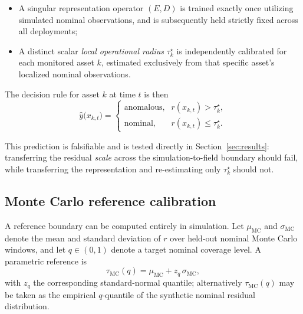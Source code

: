 \documentclass[a4paper]{cas-sc}
\newcommand{\residual}{\ensuremath{r}}
\newcommand{\taumc}{\ensuremath{\tau_{\mathrm{MC}}}}
\begin{document}
\begin{itemize}[leftmargin=1.5em]
\item A singular representation operator \((E,D)\) is trained exactly once utilizing simulated nominal observations, and is subsequently held strictly fixed across all deployments;
\item A distinct scalar \emph{local operational radius} \(\tau_k^\star\) is independently calibrated for each monitored asset \(k\), estimated exclusively from that specific asset's localized nominal observations.
\end{itemize}

The decision rule for asset \(k\) at time \(t\) is then
\begin{equation}
\hat y\bigl(x_{k,t}\bigr) =
\begin{cases}
\text{anomalous}, & \residual(x_{k,t}) > \tau_k^\star,\\[2pt]
\text{nominal},   & \residual(x_{k,t}) \le \tau_k^\star .
\end{cases}
\label{eq:decision_rule}
\end{equation}

This prediction is falsifiable and is tested directly in
Section~\ref{sec:results}: transferring the residual \emph{scale} across
the simulation-to-field boundary should fail, while transferring the
representation and re-estimating only \(\tau_k^\star\) should not.

\subsection{Monte Carlo reference calibration}
\label{subsec:mc_calibration}

A reference boundary can be computed entirely in simulation. Let
\(\mu_{\mathrm{MC}}\) and \(\sigma_{\mathrm{MC}}\) denote the mean and
standard deviation of \(\residual\) over held-out nominal Monte Carlo
windows, and let \(q\in(0,1)\) denote a target nominal coverage level. A
parametric reference is
\begin{equation}
\taumc(q) = \mu_{\mathrm{MC}} + z_q\,\sigma_{\mathrm{MC}},
\label{eq:tau_mc_quantile}
\end{equation}
with \(z_q\) the corresponding standard-normal quantile; alternatively
\(\taumc(q)\) may be taken as the empirical \(q\)-quantile of the synthetic
nominal residual distribution.
\end{document}
